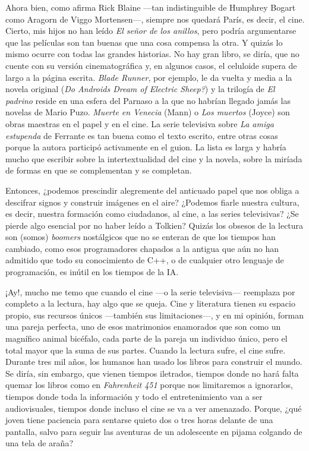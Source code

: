 Ahora bien, como afirma Rick Blaine ---tan indistinguible de Humphrey Bogart como Aragorn de Viggo Mortensen---, siempre nos quedará París, es decir, el cine. Cierto, mis hijos no han leído \emph{El señor de los anillos}, pero podría argumentarse que las películas son tan buenas que una cosa compensa la otra. Y quizás lo mismo ocurre con todas las grandes historias. No hay gran libro, se diría, que no cuente con su versión cinematográfica y, en algunos casos, el celuloide supera de largo a la página escrita. \emph{Blade Runner}, por ejemplo, le da vuelta y media a la novela original (\emph{Do Androids Dream of Electric Sheep?}) y la trilogía de \emph{El padrino} reside en una esfera del Parnaso a la que no habrían llegado jamás las novelas de Mario Puzo. \emph{Muerte en Venecia} (Mann) o \emph{Los muertos} (Joyce) son obras maestras en el papel y en el cine. La serie televisiva sobre \emph{La amiga estupenda} de Ferrante es tan buena como el texto escrito, entre otras cosas porque la autora participó activamente en el guion. La lista es larga y habría mucho que escribir sobre la intertextualidad del cine y la novela, sobre la miríada de formas en que se complementan y se completan.

Entonces, ¿podemos prescindir alegremente del anticuado papel que nos obliga a descifrar signos y construir imágenes en el aire? ¿Podemos fiarle nuestra cultura, es decir, nuestra formación como ciudadanos, al cine, a las series televisivas? ¿Se pierde algo esencial por no haber leído a Tolkien? Quizás los obsesos de la lectura son (somos) \emph{boomers} nostálgicos que no se enteran de que los tiempos han cambiado, como esos programadores chapados a la antigua que aún no han admitido que todo su conocimiento de C++, o de cualquier otro lenguaje de programación, es inútil en los tiempos de la IA.

¡Ay!, mucho me temo que cuando el cine ---o la serie televisiva--- reemplaza por completo a la lectura, hay algo que se queja. Cine y literatura tienen su espacio propio, sus recursos únicos ---también sus limitaciones---, y en mi opinión, forman una pareja perfecta, uno de esos matrimonios enamorados que son como un magnífico animal bicéfalo, cada parte de la pareja un individuo único, pero el total mayor que la suma de sus partes. Cuando la lectura sufre, el cine sufre. Durante tres mil años, los humanos han usado los libros para construir el mundo. Se diría, sin embargo, que vienen tiempos iletrados, tiempos donde no hará falta quemar los libros como en \emph{Fahrenheit 451} porque nos limitaremos a ignorarlos, tiempos donde toda la información y todo el entretenimiento van a ser audiovisuales, tiempos donde incluso el cine se va a ver amenazado. Porque, ¿qué joven tiene paciencia para sentarse quieto dos o tres horas delante de una pantalla, salvo para seguir las aventuras de un adolescente en pijama colgando de una tela de araña?

